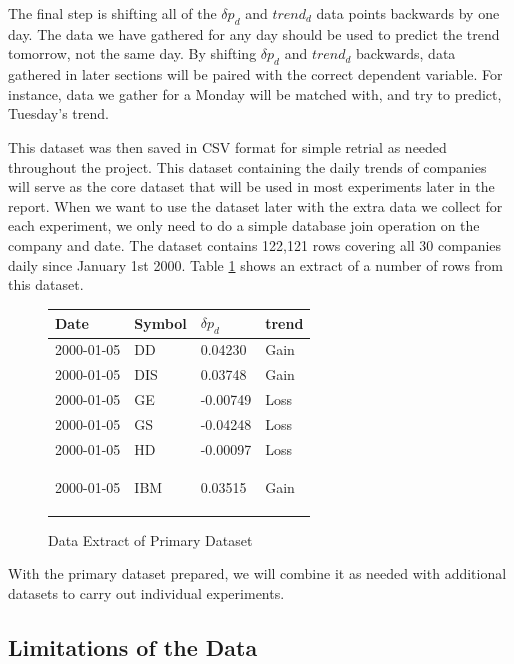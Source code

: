 \documentclass{report}
\begin{document}
The final step is shifting all of the $\delta p_{d}$ and $trend_{d}$ data points backwards by one day. The data we have gathered for any day should be used to predict the trend tomorrow, not the same day. By shifting $\delta p_{d}$ and $trend_{d}$ backwards, data gathered in later sections will be paired with the correct dependent variable. For instance, data we gather for a Monday will be matched with, and try to predict, Tuesday's trend.

This dataset was then saved in CSV format for simple retrial as needed throughout the project. This dataset containing the daily trends of companies will serve as the core dataset that will be used in most experiments later in the report. When we want to use the dataset later with the extra data we collect for each experiment, we only need to do a simple database join operation on the company and date. The dataset contains 122,121 rows covering all 30 companies daily since January 1st 2000. Table \ref{table:data-example-0} shows an extract of a number of rows from this dataset.

\begin{figure}[H]
\caption{Data Extract of Primary Dataset}
\begin{center}
  
    \begin{tabular}{l | l | l | l }
      Date & Symbol & $\delta p_{d}$ & trend \\ \hline
      2000-01-05 & DD  &	0.04230 	& Gain \\ \hline
      2000-01-05 & DIS &	0.03748 	& Gain \\ \hline
      2000-01-05 & GE  &	-0.00749 	& Loss \\ \hline
      2000-01-05 & GS  &	-0.04248 	& Loss \\ \hline
      2000-01-05 & HD  &	-0.00097 	& Loss \\ \hline
      2000-01-05 & IBM &	0.03515 	& Gain

    \label{table:data-example-0}
    \end{tabular}
\end{center}
\end{figure}

With the primary dataset prepared, we will combine it as needed with additional datasets to carry out individual experiments. 

\subsection{Limitations of the Data}
\end{document}

